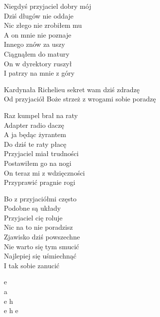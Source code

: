 \begin{text}
    Niegdyś przyjaciel dobry mój\\
    Dziś długów nie oddaje\\
    Nic złego nie zrobiłem mu\\
    A on mnie nie poznaje\\
    \vin Innego znów za uszy\\
    \vin Ciągnąłem do matury\\
    \vin On w dyrektory ruszył\\
    \vin I patrzy na mnie z góry

    Kardynała Richelieu sekret wam dziś zdradzę\\
    Od przyjaciół Boże strzeż z wrogami sobie poradzę

    Raz kumpel brał na raty\\
    Adapter radio daczę\\
    A ja będąc żyrantem\\
    Do dziś te raty płacę\\
    \vin Przyjaciel miał trudności\\
    \vin Postawiłem go na nogi\\
    \vin On teraz mi z wdzięczności\\
    \vin Przyprawić pragnie rogi

    Bo z przyjaciółmi często\\
    Podobne są układy\\
    Przyjaciel cię roluje\\
    Nic na to nie poradzisz\\
    \vin Zjawisko dziś powszechne\\
    \vin Nie warto się tym smucić\\
    \vin Najlepiej się uśmiechnąć\\
    \vin I tak sobie zanucić
\end{text}
\begin{chord}
    e\\
    a\\
    e h\\
    e h e
\end{chord}